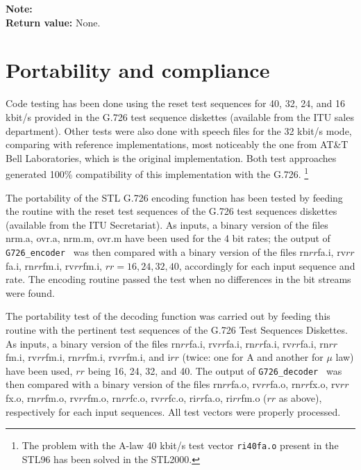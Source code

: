 {\bf Note:} \hfill {}\\

{\bf Return value: }        None.


\section{Portability and compliance} \label{G.726-Port}

Code testing has been done using the reset test sequences for 40, 32,
24, and 16 kbit/s provided in the G.726 test sequence diskettes
(available from the ITU sales department). Other tests were also done
with speech files for the 32 kbit/s mode, comparing with reference
implementations, most noticeably the one from AT\&T Bell Laboratories,
which is the original implementation. Both test approaches generated
100\% compatibility of this implementation with the G.726.
\footnote{\SF The problem with the A-law 40 kbit/s test vector
{\tt ri40fa.o} present in the STL96 has been solved in the STL2000.}

The portability of the STL G.726 encoding function has been tested by
feeding the routine with the reset test sequences of the G.726 test
sequences diskettes (available from the ITU Secretariat). As inputs,
a binary version of the files nrm.a, ovr.a, nrm.m, ovr.m have been
used for the 4 bit rates; the output of {\tt G726\_encoder } was then
compared with a binary version of the files rn$rr$fa.i, rv$rr$fa.i,
rn$rr$fm.i, rv$rr$fm.i, $rr=16,24,32,40$, accordingly for each input
sequence and rate. The encoding routine passed the test when no
differences in the bit streams were found.

The portability test of the decoding function was carried out by
feeding this routine with the pertinent test sequences of the G.726
Test Sequences Diskettes. As inputs, a binary version of the files
rn$rr$fa.i, rv$rr$fa.i, rn$rr$fa.i, rv$rr$fa.i, rn$rr$fm.i,
rv$rr$fm.i, rn$rr$fm.i, rv$rr$fm.i, and i$rr$ (twice: one for A and
another for $\mu$ law) have been used, $rr$ being 16, 24, 32, and 40.
The output of {\tt G726\_decoder } was then compared with a binary
version of the files rn$rr$fa.o, rv$rr$fa.o, rn$rr$fx.o, rv$rr$fx.o,
rn$rr$fm.o, rv$rr$fm.o, rn$rr$fc.o, rv$rr$fc.o, ri$rr$fa.o,
ri$rr$fm.o ($rr$ as above), respectively for each input sequences.
All test vectors were properly processed.


